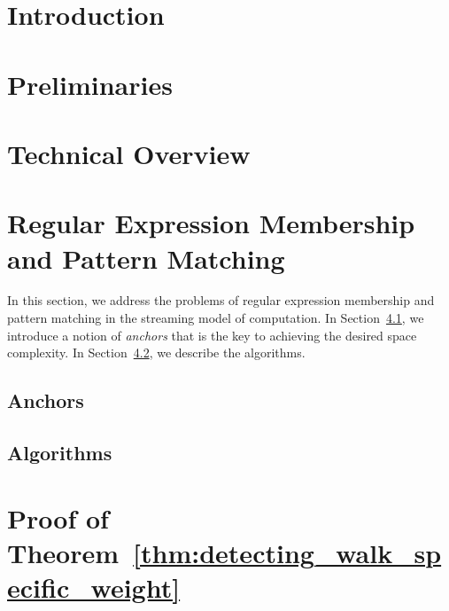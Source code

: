 \documentclass[twoside,leqno]{article}
\begin{document}
\section{Introduction}
\label{sec:introduction}


\section{Preliminaries}
\label{sec:prelim}


\section{Technical Overview}
\label{sec:overview}


\section{Regular Expression Membership and Pattern Matching}\label{sec:regexp}
In this section, we address the problems of regular expression membership and pattern matching in the streaming model of computation. In Section~\ref{sec:anchors}, we introduce a notion of \emph{anchors} that is the key to achieving the desired space complexity. In Section~\ref{sec:algorithms}, we describe the algorithms.

\subsection{Anchors}
\label{sec:anchors}


\subsection{Algorithms}
\label{sec:algorithms}


\section{Proof of Theorem~\ref{thm:detecting_walk_specific_weight}}
\label{sec:paths-in-graph}




\end{document}
